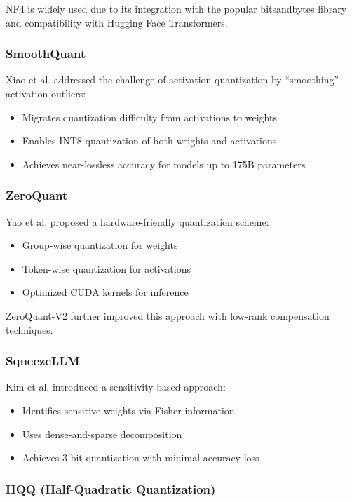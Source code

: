 \documentclass[11pt]{article}
\begin{document}
NF4 is widely used due to its integration with the popular bitsandbytes library and compatibility with Hugging Face Transformers.

\subsubsection{SmoothQuant}

Xiao et al. \cite{xiao2023smoothquant} addressed the challenge of activation quantization by ``smoothing'' activation outliers:
\begin{itemize}
    \item Migrates quantization difficulty from activations to weights
    \item Enables INT8 quantization of both weights and activations
    \item Achieves near-lossless accuracy for models up to 175B parameters
\end{itemize}

\subsubsection{ZeroQuant}

Yao et al. \cite{yao2022zeroquant} proposed a hardware-friendly quantization scheme:
\begin{itemize}
    \item Group-wise quantization for weights
    \item Token-wise quantization for activations
    \item Optimized CUDA kernels for inference
\end{itemize}
ZeroQuant-V2 \cite{yao2023zeroquantv2} further improved this approach with low-rank compensation techniques.

\subsubsection{SqueezeLLM}

Kim et al. \cite{kim2023squeezellm} introduced a sensitivity-based approach:
\begin{itemize}
    \item Identifies sensitive weights via Fisher information
    \item Uses dense-and-sparse decomposition
    \item Achieves 3-bit quantization with minimal accuracy loss
\end{itemize}

\subsubsection{HQQ (Half-Quadratic Quantization)}
\end{document}
